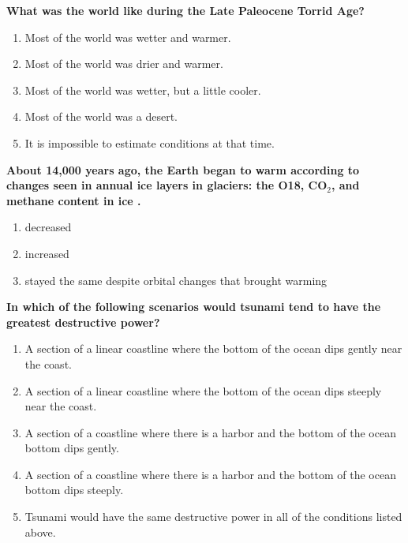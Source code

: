 \item {
\setlength{\itemsep}{0cm}
\setlength{\parskip}{.2cm}
\begin{samepage}
\textbf{
What was the world like during the Late Paleocene Torrid Age? 
}
\begin{enumerate}
\item {  Most of the world was wetter and warmer. }
\item {  Most of the world was drier and warmer. }
\item {  Most of the world was wetter, but a little cooler. }
\item {  Most of the world was a desert. }
\item {  It is impossible to estimate conditions at that time. }
\end{enumerate}
\end{samepage}
}
\item {
\setlength{\itemsep}{0cm}
\setlength{\parskip}{.2cm}
\begin{samepage}
\textbf{
About 14,000 years ago, the Earth began to warm according to changes seen in annual ice layers in glaciers: the O18, CO\ensuremath{_2}, and methane content in ice \makebox[1cm]{\Rivpt\hrulefill\Rivpt}.
}
\begin{enumerate}
\item {  decreased }
\item {  increased }
\item {  stayed the same despite orbital changes that brought warming }
\end{enumerate}
\end{samepage}
}
\item {
\setlength{\itemsep}{0cm}
\setlength{\parskip}{.2cm}
\begin{samepage}
\textbf{
In which of the following scenarios would tsunami tend to have the greatest destructive power?
}
\begin{enumerate}
\item { 	A section of a linear coastline where the bottom of the ocean dips gently near the coast. }
\item { 	A section of a linear coastline where the bottom of the ocean dips steeply near the coast. }
\item { 	A section of a coastline where there is a harbor and the bottom of the ocean bottom dips gently. }
\item { 	A section of a coastline where there is a harbor and the bottom of the ocean bottom dips steeply. }
\item { 	Tsunami would have the same destructive power in all of the conditions listed above. }
\end{enumerate}
\end{samepage}
}
